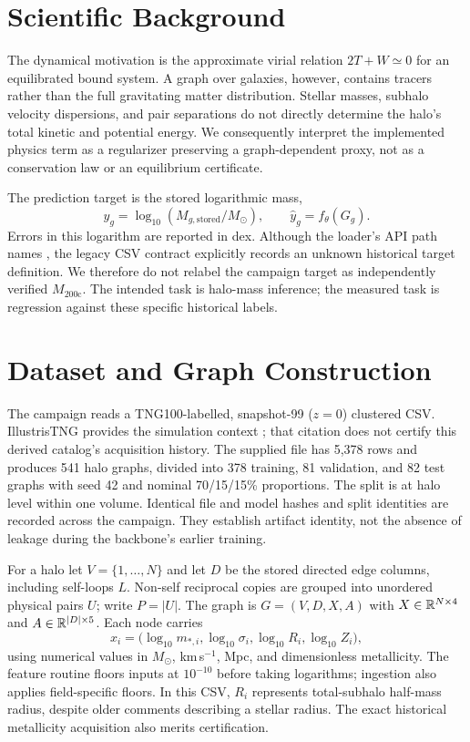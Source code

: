 \section{Scientific Background}
The dynamical motivation is the approximate virial relation $2T+W\simeq0$ for an equilibrated bound system. A graph over galaxies, however, contains tracers rather than the full gravitating matter distribution. Stellar masses, subhalo velocity dispersions, and pair separations do not directly determine the halo's total kinetic and potential energy. We consequently interpret the implemented physics term as a regularizer preserving a graph-dependent proxy, not as a conservation law or an equilibrium certificate.

The prediction target is the stored logarithmic mass,
\begin{equation}
 y_g=\log_{10}(M_{g,\mathrm{stored}}/M_\odot),\qquad
 \hat y_g=f_\theta(G_g).
\end{equation}
Errors in this logarithm are reported in dex. Although the loader's API path names , the legacy CSV contract explicitly records an unknown historical target definition. We therefore do not relabel the campaign target as independently verified $M_{200\mathrm{c}}$. The intended task is halo-mass inference; the measured task is regression against these specific historical labels.

\section{Dataset and Graph Construction}
\label{sec:data}
The campaign reads a TNG100-labelled, snapshot-99 ($z=0$) clustered CSV. IllustrisTNG provides the simulation context \citep{nelson2017}; that citation does not certify this derived catalog's acquisition history. The supplied file has 5,378 rows and produces 541 halo graphs, divided into 378 training, 81 validation, and 82 test graphs with seed 42 and nominal 70/15/15\% proportions. The split is at halo level within one volume. Identical file and model hashes and split identities are recorded across the campaign. They establish artifact identity, not the absence of leakage during the backbone's earlier training.

For a halo let $V=\{1,\ldots,N\}$ and let $D$ be the stored directed edge columns, including self-loops $L$. Non-self reciprocal copies are grouped into unordered physical pairs $U$; write $P=|U|$. The graph is $G=(V,D,X,A)$ with $X\in\mathbb{R}^{N\times4}$ and $A\in\mathbb{R}^{|D|\times5}$. Each node carries
\begin{equation}
 x_i=\bigl(\log_{10}m_{*,i},\log_{10}\sigma_i,
             \log_{10}R_i,\log_{10}Z_i\bigr),
\end{equation}
using numerical values in $M_\odot$, km\,s$^{-1}$, Mpc, and dimensionless metallicity. The feature routine floors inputs at $10^{-10}$ before taking logarithms; ingestion also applies field-specific floors. In this CSV, $R_i$ represents total-subhalo half-mass radius, despite older comments describing a stellar radius. The exact historical metallicity acquisition also merits certification.

